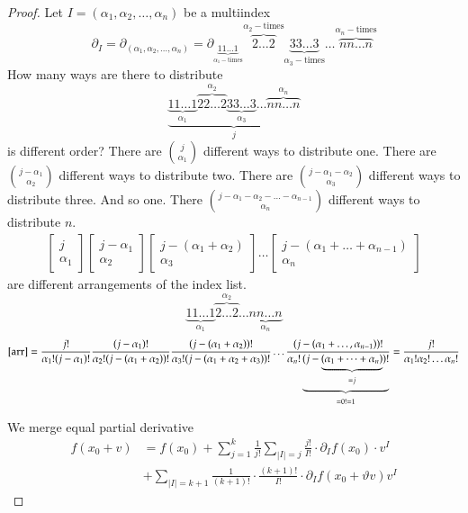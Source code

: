 \documentclass{article}
\newcommand{\card}[1]{\left|#1\right|}
\begin{document}
\begin{proof}
  Let $I = (\alpha_1, \alpha_2, \dots, \alpha_n)$ be a multiindex
  \[ \partial_I = \partial_{(\alpha_1,\alpha_2,\dots,\alpha_n)} = \partial_{\underbrace{11\dots 1}_{\alpha_1-\text{times}}} \overbrace{2 \dots 2}^{\alpha_2-\text{times}} \underbrace{3 3 \dots 3}_{\alpha_3-\text{times}} \dots \overbrace{n n \dots n}^{\alpha_n-\text{times}} \]
  How many ways are there to distribute
  \[ \underbrace{\underbrace{1 1 \dots 1}_{\alpha_1} \overbrace{2 2 \dots 2}^{\alpha_2} \underbrace{3 3 \dots 3}_{\alpha_3} \dots \overbrace{n n \dots n}^{\alpha_n}}_{j} \]
  is different order?
  There are ${j \choose \alpha_1}$ different ways to distribute one.
  There are ${j-\alpha_1 \choose \alpha_2}$ different ways to distribute two.
  There are ${j-\alpha_1-\alpha_2 \choose \alpha_3}$ different ways to distribute three.
  And so one. There ${j-\alpha_1-\alpha_2-\dots-\alpha_{n-1} \choose \alpha_n}$ different ways to distribute $n$.
  \begin{align}
    \begin{bmatrix} j \\ \alpha_1 \end{bmatrix} \begin{bmatrix} j-\alpha_1 \\ \alpha_2 \end{bmatrix} \begin{bmatrix} j-(\alpha_1 + \alpha_2) \\ \alpha_3 \end{bmatrix} \dots \begin{bmatrix} j-(\alpha_1 + \dots + \alpha_{n-1}) \\ \alpha_n \end{bmatrix} \label{arr}
  \end{align}
  are different arrangements of the index list.
  \[ \underbrace{1 1 \dots 1}_{\alpha_1} \overbrace{2 \dots 2}^{\alpha_2} \dots \underbrace{n n \dots n}_{\alpha_n} \]
  \[
    \eqref{arr} =
      \frac{j!}{\alpha_1!(j-\alpha_1)!}
      \frac{(j-\alpha_1)!}{\alpha_2! (j - (\alpha_1 + \alpha_2))!}
      \frac{(j-(\alpha_1 + \alpha_2))!}{\alpha_3! (j - (\alpha_1 + \alpha_2 + \alpha_3))!}
      \dots
      \frac{(j - (\alpha_1 + \dots, \alpha_{n-1}))!}{\alpha_n! \underbrace{(j - \underbrace{(\alpha_1 + \dots + \alpha_n)}_{=j})!}_{= 0! = 1}}
      = \frac{j!}{\alpha_1! \alpha_2! \dots \alpha_n!}
  \]

  We merge equal partial derivative
  \begin{align*}
    f(x_0 + v) &= f(x_0) + \sum_{j=1}^k \frac{1}{j!} \sum_{\card{I}=j}  \frac{j!}{I!} \cdot \partial_I f(x_0) \cdot v^I \\
      &+ \sum_{\card{I} = k+1} \frac{1}{(k+1)!} \cdot \frac{(k+1)!}{I!} \cdot \partial_I f(x_0 + \vartheta v) v^I
  \end{align*}
\end{proof}
\end{document}
